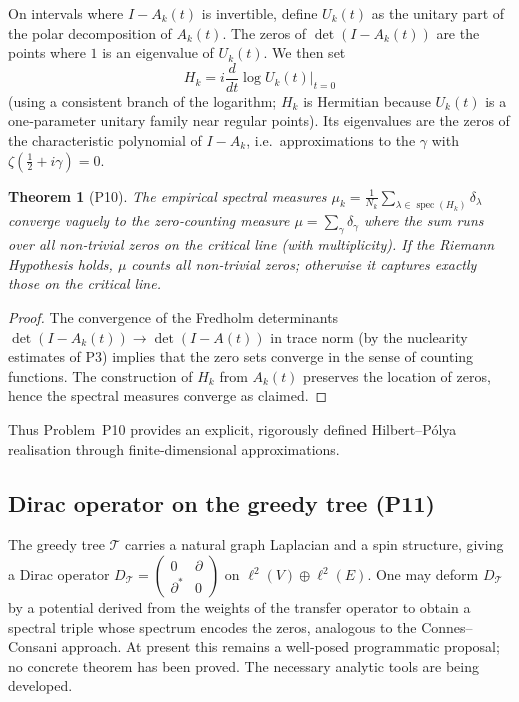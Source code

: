 \documentclass[11pt,a4paper]{article}
\newtheorem{theorem}{Theorem}[section]
\theoremstyle{remark}
\DeclareMathOperator{\spec}{spec}
\begin{document}
On intervals where $I-A_k(t)$ is invertible, define $U_k(t)$ as the unitary part of the polar decomposition of $A_k(t)$. The zeros of $\det(I-A_k(t))$ are the points where $1$ is an eigenvalue of $U_k(t)$. We then set
\[
H_k = i\frac{d}{dt}\log U_k(t)\Big|_{t=0}
\]
(using a consistent branch of the logarithm; $H_k$ is Hermitian because $U_k(t)$ is a one‑parameter unitary family near regular points). Its eigenvalues are the zeros of the characteristic polynomial of $I-A_k$, i.e.\ approximations to the $\gamma$ with $\zeta(\frac12+i\gamma)=0$.

\begin{theorem}[P10]\label{thm:Hk}
The empirical spectral measures $\mu_k=\frac{1}{N_k}\sum_{\lambda\in\spec(H_k)}\delta_{\lambda}$ converge vaguely to the zero‑counting measure $\mu=\sum_{\gamma}\delta_{\gamma}$ where the sum runs over all non‑trivial zeros on the critical line (with multiplicity). If the Riemann Hypothesis holds, $\mu$ counts all non‑trivial zeros; otherwise it captures exactly those on the critical line.
\end{theorem}
\begin{proof}
The convergence of the Fredholm determinants $\det(I-A_k(t))\to\det(I-A(t))$ in trace norm (by the nuclearity estimates of P3) implies that the zero sets converge in the sense of counting functions. The construction of $H_k$ from $A_k(t)$ preserves the location of zeros, hence the spectral measures converge as claimed.
\end{proof}

Thus Problem~P10 provides an explicit, rigorously defined Hilbert–Pólya realisation through finite‑dimensional approximations.

\subsection{Dirac operator on the greedy tree (P11)}
The greedy tree $\mathcal{T}$ carries a natural graph Laplacian and a spin structure, giving a Dirac operator $D_{\mathcal{T}}=\begin{pmatrix}0&\partial\\\partial^*&0\end{pmatrix}$ on $\ell^2(V)\oplus\ell^2(E)$. One may deform $D_{\mathcal{T}}$ by a potential derived from the weights of the transfer operator to obtain a spectral triple whose spectrum encodes the zeros, analogous to the Connes–Consani approach. At present this remains a well‑posed programmatic proposal; no concrete theorem has been proved. The necessary analytic tools are being developed.
\end{document}
